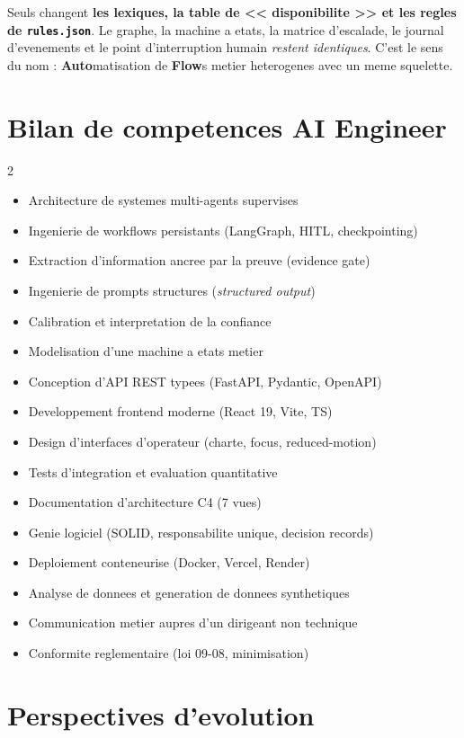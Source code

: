 \documentclass[12pt,a4paper,openany]{report}
\begin{document}
Seuls changent \textbf{les lexiques, la table de << disponibilite >> et les regles de \texttt{rules.json}}. Le graphe, la machine a etats, la matrice d'escalade, le journal d'evenements et le point d'interruption humain \emph{restent identiques}. C'est le sens du nom : \textbf{Auto}matisation de \textbf{Flow}s metier heterogenes avec un meme squelette.

\section{Bilan de competences AI Engineer}

\begin{multicols}{2}\small
\begin{itemize}[leftmargin=1.2em, itemsep=1pt]
\item Architecture de systemes multi-agents supervises
\item Ingenierie de workflows persistants (LangGraph, HITL, checkpointing)
\item Extraction d'information ancree par la preuve (evidence gate)
\item Ingenierie de prompts structures (\emph{structured output})
\item Calibration et interpretation de la confiance
\item Modelisation d'une machine a etats metier
\item Conception d'API REST typees (FastAPI, Pydantic, OpenAPI)
\item Developpement frontend moderne (React 19, Vite, TS)
\item Design d'interfaces d'operateur (charte, focus, reduced-motion)
\item Tests d'integration et evaluation quantitative
\item Documentation d'architecture C4 (7 vues)
\item Genie logiciel (SOLID, responsabilite unique, decision records)
\item Deploiement conteneurise (Docker, Vercel, Render)
\item Analyse de donnees et generation de donnees synthetiques
\item Communication metier aupres d'un dirigeant non technique
\item Conformite reglementaire (loi 09-08, minimisation)
\end{itemize}
\end{multicols}

\section{Perspectives d'evolution}
\end{document}
